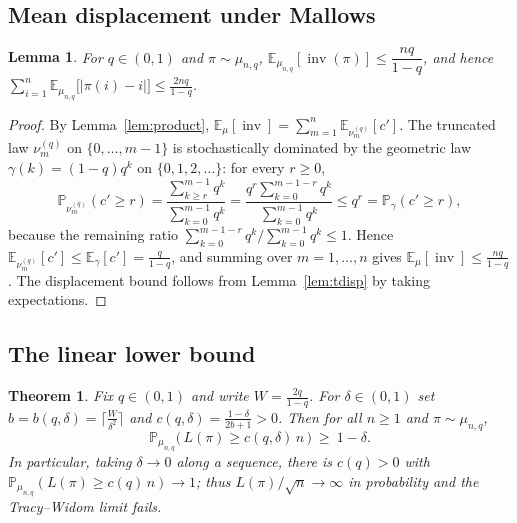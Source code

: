 \documentclass[12pt]{article}
\newtheorem{theorem}{Theorem}
\newtheorem{lemma}{Lemma}
\theoremstyle{definition}
\DeclareMathOperator{\inv}{inv}
\newcommand{\E}{\mathbb{E}}
\newcommand{\PP}{\mathbb{P}}
\begin{document}
\subsection{Mean displacement under Mallows}
\begin{lemma}\label{lem:Einv}
For $q\in(0,1)$ and $\pi\sim\mu_{n,q}$, $\E_{\mu_{n,q}}[\inv(\pi)]\le \dfrac{nq}{1-q}$, and
hence $\displaystyle\sum_{i=1}^n\E_{\mu_{n,q}}\big[|\pi(i)-i|\big]\le\frac{2nq}{1-q}$.
\end{lemma}
\begin{proof}
By Lemma~\ref{lem:product}, $\E_\mu[\inv]=\sum_{m=1}^n\E_{\nu^{(q)}_m}[c']$. The
truncated law $\nu^{(q)}_m$ on $\{0,\dots,m-1\}$ is stochastically dominated by the
geometric law $\gamma(k)=(1-q)q^k$ on $\{0,1,2,\dots\}$: for every $r\ge0$,
\[
\PP_{\nu^{(q)}_m}(c'\ge r)=\frac{\sum_{k\ge r}^{m-1}q^k}{\sum_{k=0}^{m-1}q^k}
=\frac{q^{r}\sum_{k=0}^{m-1-r}q^{k}}{\sum_{k=0}^{m-1}q^{k}}\le q^{r}=\PP_{\gamma}(c'\ge r),
\]
because the remaining ratio $\sum_{k=0}^{m-1-r}q^k/\sum_{k=0}^{m-1}q^k\le1$. Hence
$\E_{\nu^{(q)}_m}[c']\le \E_\gamma[c']=\tfrac{q}{1-q}$, and summing over $m=1,\dots,n$
gives $\E_\mu[\inv]\le \tfrac{nq}{1-q}$. The displacement bound follows from
Lemma~\ref{lem:tdisp} by taking expectations.
\end{proof}

\subsection{The linear lower bound}
\begin{theorem}\label{thm:C}
Fix $q\in(0,1)$ and write $W=\tfrac{2q}{1-q}$. For $\delta\in(0,1)$ set
$b=b(q,\delta)=\big\lceil \tfrac{W}{\delta^{2}}\big\rceil$ and
$c(q,\delta)=\tfrac{1-\delta}{2b+1}>0$. Then for all $n\ge1$ and $\pi\sim\mu_{n,q}$,
\[
\PP_{\mu_{n,q}}\big(\,L(\pi)\ge c(q,\delta)\,n\,\big)\ \ge\ 1-\delta .
\]
In particular, taking $\delta\to0$ along a sequence, there is $c(q)>0$ with
$\PP_{\mu_{n,q}}(L(\pi)\ge c(q)\,n)\to1$; thus $L(\pi)/\sqrt n\to\infty$ in probability
and the Tracy--Widom limit fails.
\end{theorem}
\end{document}
